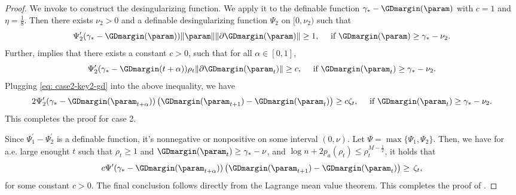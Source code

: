\begin{proof}
    We invoke  to construct the desingularizing function.  We apply it to the definable function $\gamma_* - \GDmargin(\param)$ with $c=1$ and $\eta=\frac{1}{8}$. Then there exists $\nu_2 >0$ and a definable desingularizing function $\Psi_2$ on $[0, \nu_2)$ such that
    \[
        \Psi_2^\prime(\gamma_* - \GDmargin(\param)) \| \param \| \|\partial \GDmargin(\param)\| \ge 1, \quad \text{ if }  \GDmargin(\param) \ge \gamma_* - \nu_2.
    \]
    Further,  implies that there exists a constant $c>0$, such that for all $\alpha \in [0, 1]$,
    \begin{equation}
        \Psi_2^\prime(\gamma_* - \GDmargin(t+\alpha)) \rho_t \|\partial \GDmargin(\param_t) \| \ge c, \quad \text{ if }  \GDmargin(\param_t) \ge \gamma_* - \nu_2.
    \end{equation}
    Plugging \eqref{eq: case2-key2-gd} into the above inequality, we have 
    \[
        2\Psi_2^\prime(\gamma_* - \GDmargin (\param_{t+\alpha})) \left( \GDmargin (\param_{t+1}) - \GDmargin (\param_t) \right) \ge c \zeta_t, \quad \text{ if }  \GDmargin (\param_t) \ge \gamma_* - \nu_2.
    \]
    This completes the proof for case 2. 
    
    Since $\Psi_1^\prime  - \Psi_2^\prime$ is a definable function, it's nonnegative or nonpositive on some interval $(0, \nu)$. Let $\Psi = \max \{\Psi_1, \Psi_2\}$. Then, we have for a.e. large enought $t$ such that $\rho_t \ge 1$ and $\GDmargin (\param_t) \ge \gamma_* - \nu$, and $\log n + 2p_a(\rho_t) \le \rho_t^{M-\frac{1}{2}}$, it holds that 
    \[
        c \Psi' (\gamma_* - \GDmargin (\param_{t+\alpha})) \left( \GDmargin (\param_{t+1}) - \GDmargin (\param_t) \right) \ge \, \zeta_t,
    \]
    for some constant $c>0$. The final conclusion follows directly from the Lagrange mean value theorem. This completes the proof of .
\end{proof}


